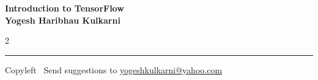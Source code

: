 \documentclass[8pt,landscape]{article}
\begin{document}
\footnotesize


\begin{center}
\Large{\textbf{Introduction to TensorFlow\\ Yogesh Haribhau Kulkarni}}  
\end{center}

\begin{multicols}{2}

\end{multicols}

\rule{\linewidth}{0.25pt}
\scriptsize
Copyleft \textcopyleft\  Send suggestions to 
\href{http://yati.io}{yogeshkulkarni@yahoo.com}
\end{document}
